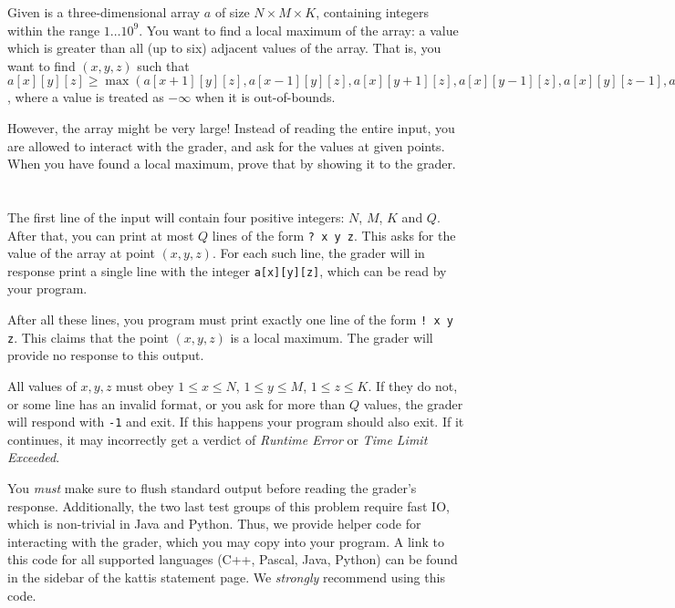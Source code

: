\ifx\boi\undefined\fi
\def\version{jury-draft}

Given is a three-dimensional array $a$ of size $N \times M \times K$, containing integers within the range $1 \dots 10^9$.
You want to find a local maximum of the array: a value which is greater than all (up to six) adjacent values of the array.
That is, you want to find $(x,y,z)$ such that $a[x][y][z] \ge \max(a[x+1][y][z], a[x-1][y][z], a[x][y+1][z], a[x][y-1][z], a[x][y][z-1], a[x][y][z+1])$,
where a value is treated as $-\infty$ when it is out-of-bounds.

However, the array might be very large!
Instead of reading the entire input, you are allowed to interact with the grader, and ask for the values at given points.
When you have found a local maximum, prove that by showing it to the grader.

\section*{\interactivity}
The first line of the input will contain four positive integers: $N$, $M$, $K$ and $Q$.
After that, you can print at most $Q$ lines of the form \texttt{? x y z}.
This asks for the value of the array at point $(x, y, z)$.
For each such line, the grader will in response print a single line with the integer \texttt{a[x][y][z]}, which can be read by your program.

After all these lines, you program must print exactly one line of the form \texttt{! x y z}.
This claims that the point $(x, y, z)$ is a local maximum.
The grader will provide no response to this output.

All values of $x, y, z$ must obey $1 \le x \le N$, $1 \le y \le M$, $1 \le z \le K$.
If they do not, or some line has an invalid format, or you ask for more than $Q$ values,
the grader will respond with \texttt{-1} and exit.
If this happens your program should also exit. If it continues, it may incorrectly get
a verdict of \emph{Runtime Error} or \emph{Time Limit Exceeded}.

You \emph{must} make sure to flush standard output before reading the grader's response.
Additionally, the two last test groups of this problem require fast IO, which is non-trivial in Java and Python.
Thus, we provide helper code for interacting with the grader, which you may copy into your program.
A link to this code for all supported languages (C++, Pascal, Java, Python) can
be found in the sidebar of the kattis statement page.
We \emph{strongly} recommend using this code.

